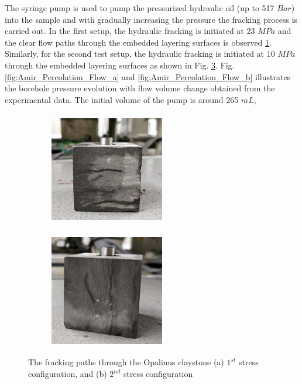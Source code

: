 The syringe pump is used to pump the pressurized hydraulic oil (up to 517 $Bar$) into the sample and with gradually increasing the pressure the fracking process is carried out. In the first setup, the hydraulic fracking is initiated at 23 $MPa$ and the clear flow paths through the embedded layering surfaces is observed \ref{fig:Amir_Percolation_Frack_a}. Similarly, for the second test setup, the hydraulic fracking is initiated at 10 $MPa$ through the embedded layering surfaces as shown in Fig. \ref{fig:Amir_Percolation_Frack_b}. Fig. \ref{fig:Amir_Percolation_Flow_a} and \ref{fig:Amir_Percolation_Flow_b} illustrates the borehole pressure evolution with flow volume change obtained from the experimental data. The initial volume of the pump is around 265 $mL$,


\begin{figure}[!ht]
\begin{subfigure}[c]{0.48\textwidth}
\centering
\includegraphics[width=5cm,height=5cm]{figures/Amir_Percolation_Frack_a.png}
\subcaption{}
\label{fig:Amir_Percolation_Frack_a}
\end{subfigure}
\hfill
\begin{subfigure}[c]{0.48\textwidth}
\centering
\includegraphics[width=5cm,height=5cm]{figures/Amir_Percolation_Frack_b.png}
\subcaption{}
\label{fig:Amir_Percolation_Frack_b}
\end{subfigure}
\caption{The fracking paths through the Opalinus claystone (a) $1^{st}$ stress configuration, and (b) $2^{nd}$ stress configuration}
\end{figure}

